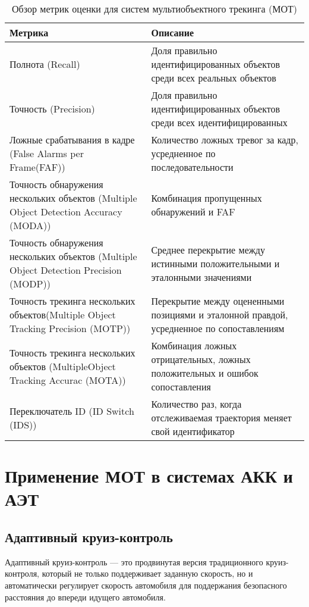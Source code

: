 \begin{table}[H]
	\centering
	\caption{Обзор метрик оценки для систем мультиобъектного трекинга (МОТ)}
	\label{tab::metrics}
	\begin{tabularx}{\textwidth}{|X|X|}
		\hline
		Метрика & Описание\\ 
		\hline
		Полнота (Recall) & Доля правильно идентифицированных объектов среди всех реальных объектов \\
		\hline
		Точность (Precision) & Доля правильно идентифицированных объектов среди всех идентифицированных\\
		\hline
		Ложные срабатывания в кадре (False Alarms per Frame(FAF)) & Количество ложных тревог за кадр, усредненное по последовательности \\
		\hline
		Точность обнаружения нескольких объектов (Multiple Object Detection Accuracy (MODA)) & Комбинация пропущенных обнаружений и FAF \\
		\hline
		Точность обнаружения нескольких объектов (Multiple Object Detection Precision (MODP)) & Среднее перекрытие между истинными положительными и эталонными значениями \\
		\hline
		Точность трекинга нескольких объектов(Multiple Object Tracking Precision (MOTP)) & 
		Перекрытие между оцененными позициями и эталонной правдой, усредненное по сопоставлениям  \\ 
		\hline
		Точность трекинга нескольких объектов (MultipleObject Tracking Accurac (MOTA)) & Комбинация ложных отрицательных, ложных положительных и ошибок сопоставления \\
		\hline
		Переключатель ID (ID Switch (IDS)) & Количество раз, когда отслеживаемая траектория меняет свой идентификатор \\
		\hline
	\end{tabularx}
\end{table}


\chapter{Применение МОТ в системах АКК и АЭТ}

\section{Адаптивный круиз-контроль}
Адаптивный круиз-контроль --- это продвинутая версия традиционного круиз-контроля, который не только поддерживает заданную скорость, но и автоматически регулирует скорость автомобиля для поддержания безопасного расстояния до впереди идущего автомобиля.

